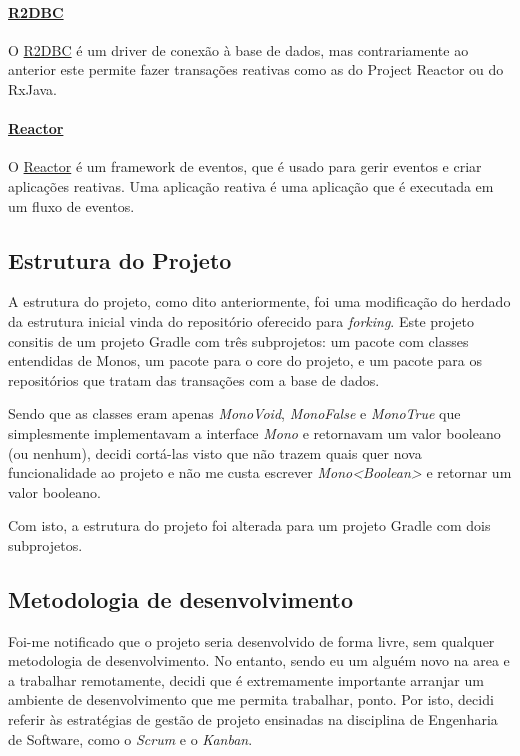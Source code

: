 \paragraph{\href{https://r2dbc.io/}{R2DBC}\\}

O \href{https://r2dbc.io/}{R2DBC} é um driver de conexão à base de dados, mas contrariamente ao anterior este permite fazer transações reativas como as do Project Reactor ou do RxJava.

\paragraph{\href{https://projectreactor.io/}{Reactor}\\}

O \href{https://projectreactor.io/}{Reactor} é um framework de eventos, que é usado para gerir eventos e criar aplicações reativas. Uma aplicação reativa é uma aplicação que é executada em um fluxo de eventos.

\subsection{Estrutura do Projeto}

A estrutura do projeto, como dito anteriormente, foi uma modificação do herdado da estrutura inicial vinda do repositório oferecido para \textit{forking}. Este projeto consitis de um projeto Gradle com três subprojetos: um pacote com classes entendidas de Monos, um pacote para o core do projeto, e um pacote para os repositórios que tratam das transações com a base de dados.

Sendo que as classes eram apenas \textit{MonoVoid}, \textit{MonoFalse} e \textit{MonoTrue} que simplesmente implementavam a interface \textit{Mono} e retornavam um valor booleano (ou nenhum), decidi cortá-las visto que não trazem quais quer nova funcionalidade ao projeto e não me custa escrever \textit{Mono<Boolean>} e retornar um valor booleano.

Com isto, a estrutura do projeto foi alterada para um projeto Gradle com dois subprojetos.

\newpage

\subsection{Metodologia de desenvolvimento}

Foi-me notificado que o projeto seria desenvolvido de forma livre, sem qualquer metodologia de desenvolvimento. No entanto, sendo eu um alguém novo na area e a trabalhar remotamente, decidi que é extremamente importante arranjar um ambiente de desenvolvimento que me permita trabalhar, ponto. Por isto, decidi referir às estratégias de gestão de projeto ensinadas na disciplina de Engenharia de Software, como o \textit{Scrum} e o \textit{Kanban}.

